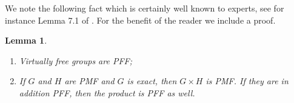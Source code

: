 \documentclass[10pt]{amsart}
\newtheorem{lem}[thm]{Lemma}
\theoremstyle{definition}
\newcommand{\Z}{\ensuremath{\mathbb{Z}}}
\newcommand{\cU}{\ensuremath{\mathcal{U}}}
\begin{document}

We note the following fact which is certainly well known to experts, see for instance Lemma 7.1 of \cite{loudermagee2025limitgroups}. For the benefit of the reader we include a proof.

\begin{lem}\label{lem:strong-MF-facts}
    \;
    \begin{enumerate}
        \item Virtually free groups are PFF;
        \item If $G$ and $H$ are PMF and $G$ is exact, then $G \times H$ is PMF. If they are in addition PFF, then the product is PFF as well.
    \end{enumerate}
\end{lem}
\end{document}
